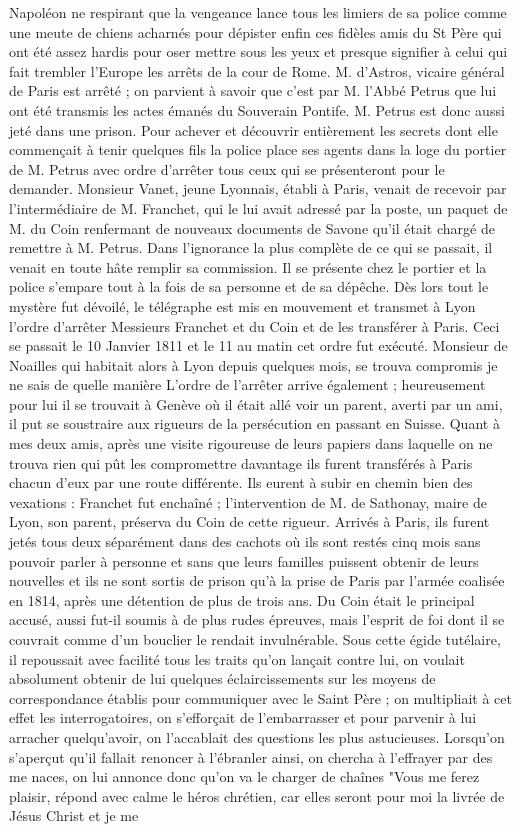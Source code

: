 \documentclass[11pt,a4paper]{report}
\begin{document}
Napoléon ne respirant que la vengeance lance tous les limiers de sa police comme une meute de chiens acharnés pour dépister enfin ces fidèles amis du St Père qui ont été assez hardis pour oser mettre sous les yeux et presque signifier à celui qui fait trembler l'Europe les arrêts de la cour de Rome. M. d'Astros, vicaire général de Paris est arrêté ; on parvient à savoir que c'est par M. l'Abbé Petrus que lui ont été transmis les actes émanés du Souverain Pontife. M. Petrus est donc aussi jeté dans une prison. Pour achever et découvrir entièrement les secrets dont elle commençait à tenir quelques fils la police place ses agents dans la loge du portier de M. Petrus avec ordre d'arrêter tous ceux qui se présenteront pour le demander. Monsieur Vanet, jeune Lyonnais, établi à Paris, venait de recevoir par l'intermédiaire de M. Franchet, qui le lui avait adressé par la poste, un paquet de M. du Coin renfermant de nouveaux documents de Savone qu'il était chargé de remettre à M. Petrus. Dans l'ignorance la plus complète de ce qui se passait, il venait en toute hâte remplir sa commission. Il se présente chez le portier et la police s'empare tout à la fois de sa personne et de sa dépêche. Dès lors tout le mystère fut dévoilé, le télégraphe est mis en mouvement et transmet à Lyon l'ordre d'arrêter Messieurs Franchet et du Coin et de les transférer à Paris. Ceci se passait le 10 Janvier 1811 et le 11 au matin cet ordre fut exécuté. Monsieur de Noailles qui habitait alors à Lyon depuis quelques mois, se trouva compromis je ne sais de quelle manière L'ordre de l'arrêter arrive également ; heureusement pour lui il se trouvait à Genève où il était allé voir un parent, averti par un ami, il put se soustraire aux rigueurs de la persécution en passant en Suisse. Quant à mes deux amis, après une visite rigoureuse de leurs papiers dans laquelle on ne trouva rien qui pût les compromettre davantage ils furent transférés à Paris chacun d'eux par une route différente. Ils eurent à subir en chemin bien des vexations : Franchet fut enchaîné ; l'intervention de M. de Sathonay, maire de Lyon, son parent, préserva du Coin de cette rigueur. Arrivés à Paris, ils furent jetés tous deux séparément dans des cachots où ils sont restés cinq mois sans pouvoir parler à personne et sans que leurs familles puissent obtenir de leurs nouvelles et ils ne sont sortis de prison qu'à la prise de Paris par l'armée coalisée en 1814, après une détention de plus de trois ans. Du Coin était le principal accusé, aussi fut-il soumis à de plus rudes épreuves, mais l'esprit de foi dont il se couvrait comme d'un bouclier le rendait invulnérable. Sous cette égide tutélaire, il repoussait avec facilité tous les traits qu'on lançait contre lui, on voulait absolument obtenir de lui quelques éclaircissements sur les moyens de correspondance établis pour communiquer avec le Saint Père ; on multipliait à cet effet les interrogatoires, on s'efforçait de l'embarrasser et pour parvenir à lui arracher quelqu'avoir, on l'accablait des questions les plus astucieuses. Lorsqu'on s'aperçut qu'il fallait renoncer à l'ébranler ainsi, on chercha à l'effrayer par des me naces, on lui annonce donc qu'on va le charger de chaînes "Vous me ferez plaisir, répond avec calme le héros chrétien, car elles seront pour moi la livrée de Jésus Christ et je me 
\end{document}
